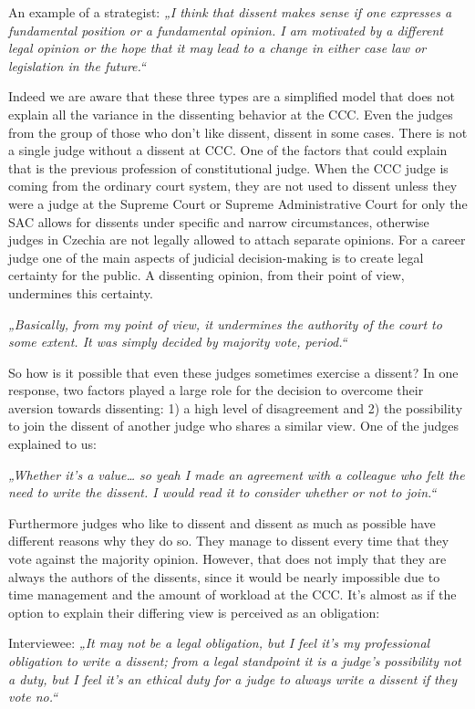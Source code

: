 \documentclass[
  11pt,
]{article}
\begin{document}
An example of a strategist: \emph{„I think that dissent makes sense if one expresses a fundamental position or a fundamental opinion. I am motivated by a different legal opinion or the hope that it may lead to a change in either case law or legislation in the future.``}

Indeed we are aware that these three types are a simplified model that does not explain all the variance in the dissenting behavior at the CCC. Even the judges from the group of those who don't like dissent, dissent in some cases. There is not a single judge without a dissent at CCC. One of the factors that could explain that is the previous profession of constitutional judge. When the CCC judge is coming from the ordinary court system, they are not used to dissent unless they were a judge at the Supreme Court or Supreme Administrative Court for only the SAC allows for dissents under specific and narrow circumstances, otherwise judges in Czechia are not legally allowed to attach separate opinions. For a career judge one of the main aspects of judicial decision-making is to create legal certainty for the public. A dissenting opinion, from their point of view, undermines this certainty.

\emph{„Basically, from my point of view, it undermines the authority of the court to some extent. It was simply decided by majority vote, period.``}

So how is it possible that even these judges sometimes exercise a dissent? In one response, two factors played a large role for the decision to overcome their aversion towards dissenting: 1) a high level of disagreement and 2) the possibility to join the dissent of another judge who shares a similar view. One of the judges explained to us:

\emph{„Whether it's a value\ldots{} so yeah I made an agreement with a colleague who felt the need to write the dissent. I would read it to consider whether or not to join.``}

Furthermore judges who like to dissent and dissent as much as possible have different reasons why they do so. They manage to dissent every time that they vote against the majority opinion. However, that does not imply that they are always the authors of the dissents, since it would be nearly impossible due to time management and the amount of workload at the CCC. It's almost as if the option to explain their differing view is perceived as an obligation:

Interviewee: \emph{„It may not be a legal obligation, but I feel it's my professional obligation to write a dissent; from a legal standpoint it is a judge's possibility not a duty, but I feel it's an ethical duty for a judge to always write a dissent if they vote no.``}
\end{document}
